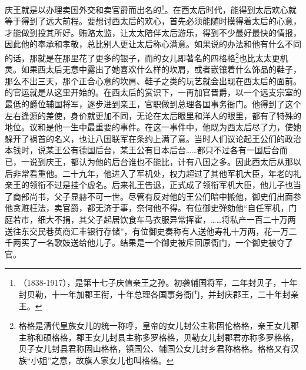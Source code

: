 庆王就是以办理卖国外交和卖官爵而出名的\footnote{（1838-1917），是第十七子庆值亲王之孙。初袭辅国将军，二年封贝子，十年封贝勒，十一年加郡王衔，十年总理各国事务衙门，并封庆郡王，二十年封亲王。}。在西太后时代，能得到太后欢心就等于得到了远大前程。要想讨西太后的欢心，首先必须能随时摸得着太后的心意，才能做到投其所好。贿赂太监，让太太陪伴太后游乐，得到不少最好最快的情报，因此他的奉承和孝敬，总比别人更让太后称心满意。如果说的办法和他有什么不同的话，那就是在那里花了更多的银子，而的女儿即著名的四格格\footnote{格格是清代皇族女儿的统一称呼，皇帝的女儿封公主称固伦格格，亲王女儿郡主称和硕格格，郡王女儿封县主称多罗格格，贝勒女儿封郡君亦称多罗格格，贝子女儿封县君称固山格格，镇国公、辅国公女儿封乡君称格格。格格又有汉族“小姐”之意，故旗人家女儿也叫格格。}也比太太更机灵。如果西太后无意中露出了她喜欢什么样的坎肩，或者嵌镶着什么饰品的鞋子，那么不出三天，那个正合心意的坎肩、鞋子之类的玩艺就会出现在西太后的面前。的官运就是从这里开始的。在西太后的赏识下，一再加官晋爵，以一个远支宗室的最低的爵位辅国将军，逐步进到亲王，官职做到总理各国事务衙门。他得到了这个左右逢源的差使，身价就更加不同，无论在太后眼里和洋人的眼里，都有了特殊的地位。议和是他一生中最重要的事件。在这一事件中，他既为西太后尽了力，使她躲开了祸首的名义，也让八国联军在条约上满了意。当时人们议论起王公们的政治本钱时，说某王公有德国后台，某王公有日本后台……都只不过各有一国后台而已，一说到庆王，都认为他的后台谁也不能比，计有八国之多。因此西太后从那以后非常看重他。二十九年，他进入了军机处，权力超过了其他军机大臣，年老的礼亲王的领衔不过是挂个虚名。后来礼王告退，正式成了领衔军机大臣，他儿子也当了商部尚书，父子显赫不可一世。尽管有反对他的王公们暗中搬他，御史们出面参他贪赃枉法，卖官爵，都无济于事，奈何他不得。有位御史弹劾他“自任军机，门庭若市，细大不捐，其父子起居饮食车马衣服异常挥霍，……将私产一百二十万两送往东交民巷英商汇丰银行存储”，有位御史奏称有人送他寿礼十万两，花一万二千两买了一名歌妓送给他儿子。结果是一个御史被斥回原衙门，一个御史被夺了官。\\

